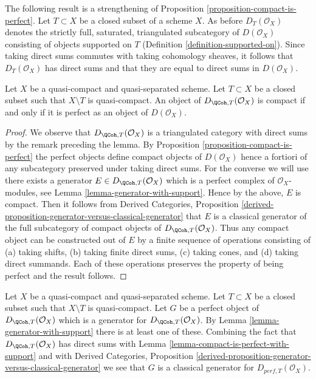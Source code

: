 \noindent
The following result is a strengthening of
Proposition \ref{proposition-compact-is-perfect}.
Let $T \subset X$ be a closed subset of a scheme $X$. As before
$D_T(\mathcal{O}_X)$ denotes the strictly full, saturated,
triangulated subcategory of $D(\mathcal{O}_X)$ consisting of objects
supported on $T$ (Definition \ref{definition-supported-on}).
Since taking direct sums commutes with taking cohomology sheaves, it follows
that $D_T(\mathcal{O}_X)$ has direct sums and that they are equal
to direct sums in $D(\mathcal{O}_X)$.

\begin{lemma}
\label{lemma-compact-is-perfect-with-support}
Let $X$ be a quasi-compact and quasi-separated scheme.
Let $T \subset X$ be a closed subset such that $X \setminus T$
is quasi-compact. An object of $D_{\QCoh, T}(\mathcal{O}_X)$ is compact
if and only if it is perfect as an object of $D(\mathcal{O}_X)$.
\end{lemma}

\begin{proof}
We observe that $D_{\QCoh, T}(\mathcal{O}_X)$ is a triangulated
category with direct sums by the remark preceding the lemma.
By Proposition \ref{proposition-compact-is-perfect}
the perfect objects define compact objects of $D(\mathcal{O}_X)$
hence a fortiori of any subcategory preserved under taking direct
sums. For the converse we will use there exists a generator
$E \in D_{\QCoh, T}(\mathcal{O}_X)$ which is a perfect complex
of $\mathcal{O}_X$-modules, see
Lemma \ref{lemma-generator-with-support}.
Hence by the above, $E$ is compact. Then it follows from
Derived Categories, Proposition
\ref{derived-proposition-generator-versus-classical-generator}
that $E$ is a classical generator of the full subcategory
of compact objects of $D_{\QCoh, T}(\mathcal{O}_X)$.
Thus any compact object can be constructed out of $E$ by
a finite sequence of operations consisting of
(a) taking shifts, (b) taking finite direct sums, (c) taking cones, and
(d) taking direct summands. Each of these operations preserves
the property of being perfect and the result follows.
\end{proof}

\begin{remark}
\label{remark-classical-generator-with-support}
Let $X$ be a quasi-compact and quasi-separated scheme.
Let $T \subset X$ be a closed subset such that $X \setminus T$
is quasi-compact. Let $G$ be a
perfect object of $D_{\QCoh, T}(\mathcal{O}_X)$ which is a generator for
$D_{\QCoh, T}(\mathcal{O}_X)$. By Lemma \ref{lemma-generator-with-support}
there is at least one of these. Combining the fact that
$D_{\QCoh, T}(\mathcal{O}_X)$ has direct sums with
Lemma \ref{lemma-compact-is-perfect-with-support} and with
Derived Categories, Proposition
\ref{derived-proposition-generator-versus-classical-generator}
we see that $G$ is a classical generator for $D_{perf, T}(\mathcal{O}_X)$.
\end{remark}


